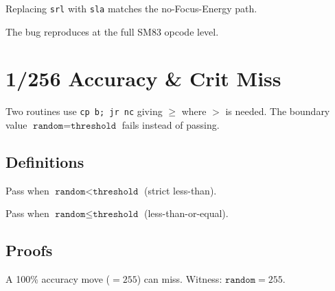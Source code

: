 \begin{theorem}\label{thm:focus_energy_fix}
  \leanok
  Replacing \texttt{srl} with \texttt{sla} matches the no-Focus-Energy path.
\end{theorem}

\begin{theorem}\label{thm:focus_energy_cpu}
  \leanok
  The bug reproduces at the full SM83 opcode level.
\end{theorem}

\chapter{1/256 Accuracy \& Crit Miss}\label{ch:one_in_256}

Two routines use \texttt{cp b; jr nc} giving $\ge$ where $>$ is needed.
The boundary value $\texttt{random} = \texttt{threshold}$ fails instead of passing.

\section{Definitions}

\begin{definition}\label{def:check_actual}
  \leanok
  Pass when $\texttt{random} < \texttt{threshold}$ (strict less-than).
\end{definition}

\begin{definition}\label{def:check_spec}
  \leanok
  Pass when $\texttt{random} \le \texttt{threshold}$ (less-than-or-equal).
\end{definition}

\section{Proofs}

\begin{theorem}\label{thm:accuracy_bug_exists}
  \leanok
  A 100\% accuracy move ($= 255$) can miss. Witness: $\texttt{random} = 255$.
\end{theorem}

